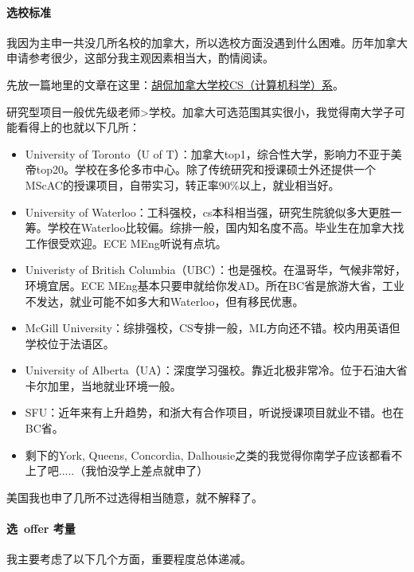 \paragraph{选校标准}
我因为主申一共没几所名校的加拿大，所以选校方面没遇到什么困难。历年加拿大申请参考很少，这部分我主观因素相当大，酌情阅读。

先放一篇地里的文章在这里：\href{https://www.1point3acres.com/bbs/viewthread.php?tid=252&highlight=}{胡侃加拿大学校CS（计算机科学）系}。

研究型项目一般优先级老师>学校。加拿大可选范围其实很小，我觉得南大学子可能看得上的也就以下几所：

\begin{itemize}
    \item University of Toronto（U of T）：加拿大top1，综合性大学，影响力不亚于美帝top20。学校在多伦多市中心。除了传统研究和授课硕士外还提供一个MScAC的授课项目，自带实习，转正率90\%以上，就业相当好。
    \item University of Waterloo：工科强校，cs本科相当强，研究生院貌似多大更胜一筹。学校在Waterloo比较偏。综排一般，国内知名度不高。毕业生在加拿大找工作很受欢迎。ECE MEng听说有点坑。
    \item Univeristy of British Columbia（UBC）：也是强校。在温哥华，气候非常好，环境宜居。ECE MEng基本只要申就给你发AD。所在BC省是旅游大省，工业不发达，就业可能不如多大和Waterloo，但有移民优惠。
    \item McGill University：综排强校，CS专排一般，ML方向还不错。校内用英语但学校位于法语区。
    \item University of Alberta（UA）：深度学习强校。靠近北极非常冷。位于石油大省卡尔加里，当地就业环境一般。
    \item SFU：近年来有上升趋势，和浙大有合作项目，听说授课项目就业不错。也在BC省。
    \item 剩下的York, Queens, Concordia, Dalhousie之类的我觉得你南学子应该都看不上了吧.....（我怕没学上差点就申了）
\end{itemize}

美国我也申了几所不过选得相当随意，就不解释了。

\paragraph{选\ offer 考量}

我主要考虑了以下几个方面，重要程度总体递减。

